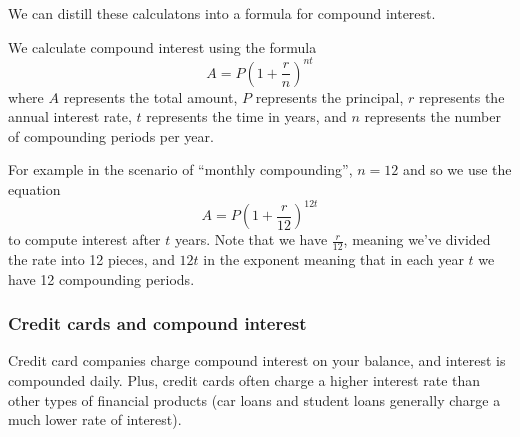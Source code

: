 
We can distill these calculatons into a formula for compound interest.

\begin{boxeddef}
We calculate compound interest using the formula \[A = P\left(1+\frac{r}{n}\right)^{nt}\]
where $A$ represents the total amount, $P$ represents the principal, $r$ represents the annual interest rate, $t$ represents the time in years, and $n$ represents the number of compounding periods per year.
\end{boxeddef}

For example in the scenario of ``monthly compounding'', $n=12$ and so we use the equation \[A = P\left( 1 + \frac{r}{12}\right)^{12t}\] to compute interest after $t$ years. Note that we have $\frac{r}{12}$, meaning we've divided the rate into 12 pieces, and $12t$ in the exponent meaning that in each year $t$ we have 12 compounding periods.

\subsubsection{Credit cards and compound interest}
	
Credit card companies charge compound interest on your balance, and interest is compounded daily. Plus, credit cards often charge a higher interest rate than other types of financial products (car loans and student loans generally charge a much lower rate of interest).

